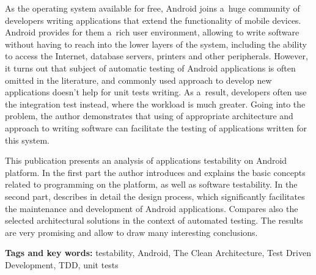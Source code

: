 As the operating system available for free, Android joins a~huge community of developers writing applications that extend the functionality of mobile devices. Android provides for them a~rich user environment, allowing to write software without having to reach into the lower layers of the system, including the ability to access the Internet, database servers, printers and other peripherals. However, it turns out that subject of automatic testing of Android applications is often omitted in the literature, and commonly used approach to develop new applications doesn't help for unit tests writing. As a~result, developers often use the integration test instead, where the workload is much greater. Going into the problem, the author demonstrates that using of appropriate architecture and approach to writing software can facilitate the testing of applications written for this system.

This publication presents an analysis of applications testability on Android platform. In the first part the author introduces and explains the basic concepts related to programming on the platform, as well as software testability. In the second part, describes in detail the design process, which significantly facilitates the maintenance and development of Android applications. Compares also the selected architectural solutions in the context of automated testing. The results are very promising and allow to draw many interesting conclusions.

\textbf{Tags and key words:} testability, Android, The Clean Architecture, Test Driven Development, TDD, unit tests


